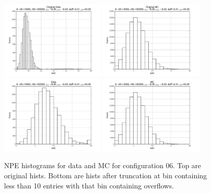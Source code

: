  \begin{figure}[htbp] \begin{center} 
\includegraphics[width=0.45\textwidth]{../FIGURES/06/FIG_Original_Data.pdf} 
\includegraphics[width=0.45\textwidth]{../FIGURES/06/FIG_Original_MC.pdf} 
\includegraphics[width=0.45\textwidth]{../FIGURES/06/FIG_Data.pdf} 
\includegraphics[width=0.45\textwidth]{../FIGURES/06/FIG_MC.pdf} 
\caption{NPE histograms for data and MC for configuration 06. Top are original hists. Bottom are hists after truncation at bin containing less than 10 entries with that bin containing overflows.} 
\label{tab:npe_06} 
\end{center} \end{figure} 

 